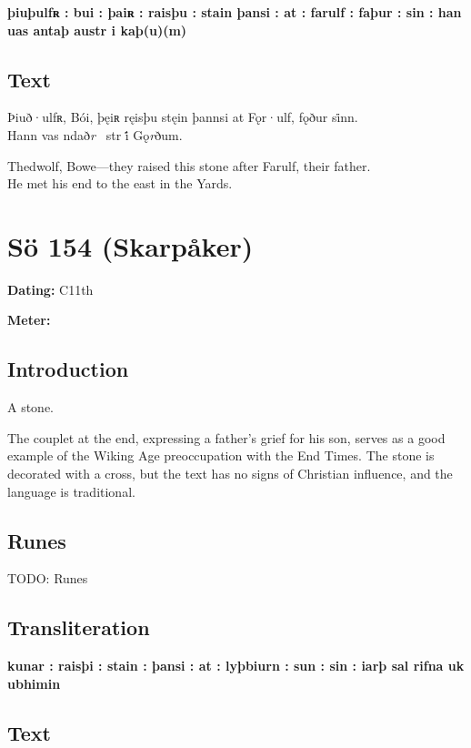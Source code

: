 \textbf{þiuþulfʀ : bui : þaiʀ : raisþu : stain þansi : at : farulf : faþur : sin : han uas antaþ austr i kaþ(u)(m)}

\subsection{Text}

\bpg\bpa[0]%
Þiuð·ulfʀ, Bói, þęiʀ ręisþu stęin þannsi at Fǫr·ulf, fǫður si̇nn. \\
Hann vas ndað\emph{r} \hld\ str i̇́ Gǫ\emph{r}ðum.\epa

\bpb Thedwolf, Bowe---they raised this stone after Farulf, their father. \\
He met his end to the east in the Yards.\epb\epg

\sectionline\clearpage


\section{Sö 154 (Skarpåker)}

\begin{flushright}%
\textbf{Dating:} C11th

\textbf{Meter:} \Fornyrdislag
\end{flushright}%

\subsection{Introduction}

A stone.

The couplet at the end, expressing a father’s grief for his son, serves as a good example of the Wiking Age preoccupation with the End Times.  The stone is decorated with a cross, but the text has no signs of Christian influence, and the language is traditional.

\subsection{Runes}

TODO: Runes%

\subsection{Transliteration}

\textbf{kunar : raisþi : stain : þansi : at : lyþbiurn : sun : sin : iarþ sal rifna uk ubhimin}

\subsection{Text}


